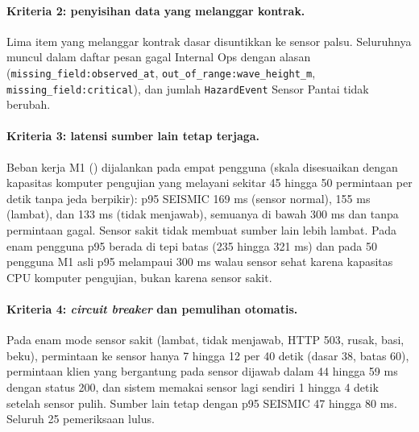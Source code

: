 \paragraph*{Kriteria 2: penyisihan data yang melanggar kontrak.}
Lima item yang melanggar kontrak dasar disuntikkan ke sensor palsu. Seluruhnya muncul dalam daftar pesan gagal Internal Ops dengan alasan (\texttt{missing\_field:observed\_at}, \texttt{out\_of\_range:wave\_height\_m}, \texttt{missing\_field:critical}), dan jumlah \texttt{HazardEvent} Sensor Pantai tidak berubah.

\paragraph*{Kriteria 3: latensi sumber lain tetap terjaga.}
Beban kerja M1 () dijalankan pada empat pengguna (skala disesuaikan dengan kapasitas komputer pengujian yang melayani sekitar 45 hingga 50 permintaan per detik tanpa jeda berpikir): p95 SEISMIC 169 ms (sensor normal), 155 ms (lambat), dan 133 ms (tidak menjawab), semuanya di bawah 300 ms dan tanpa permintaan gagal. Sensor sakit tidak membuat sumber lain lebih lambat. Pada enam pengguna p95 berada di tepi batas (235 hingga 321 ms) dan pada 50 pengguna M1 asli p95 melampaui 300 ms walau sensor sehat karena kapasitas CPU komputer pengujian, bukan karena sensor sakit.

\paragraph*{Kriteria 4: \textit{circuit breaker} dan pemulihan otomatis.}
Pada enam mode sensor sakit (lambat, tidak menjawab, HTTP 503, rusak, basi, beku), permintaan ke sensor hanya 7 hingga 12 per 40 detik (dasar 38, batas 60), permintaan klien yang bergantung pada sensor dijawab dalam 44 hingga 59 ms dengan status 200, dan sistem memakai sensor lagi sendiri 1 hingga 4 detik setelah sensor pulih. Sumber lain tetap dengan p95 SEISMIC 47 hingga 80 ms. Seluruh 25 pemeriksaan lulus.

